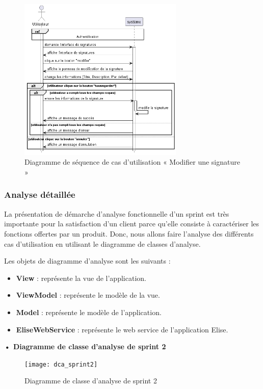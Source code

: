 \begin{figure}[H]
  \centering
  \includegraphics[width=0.7\textwidth]{out/diagrams/signatures/update/update_signature}
  \caption{Diagramme de séquence de cas d'utilisation « Modifier une signature  »}
  \label{fig:sequence_update_signature}
\end{figure}

\subsubsection{Analyse détaillée}
La présentation de démarche d'analyse fonctionnelle d'un sprint est très importante pour la satisfaction d'un client parce qu'elle consiste à caractériser les fonctions offertes par un produit.
Donc, nous allons faire l'analyse des différents cas d'utilisation en utilisant le diagramme de classes d'analyse.

Les objets de diagramme d'analyse sont les suivants :
\begin{itemize}
  \item \textbf{View} : représente la vue de l'application.
  \item \textbf{ViewModel} : représente le modèle de la vue.
  \item \textbf{Model} : représente le modèle de l'application.
  \item \textbf{EliseWebService} : représente le web service de l'application Elise.
\end{itemize}

\textbf{•	Diagramme de classe d'analyse de sprint 2 }
\newpage

\begin{figure}
  \centering
  \texttt{[image: dca\_sprint2]}
  \caption{Diagramme de classe d'analyse de sprint 2}
  \label{fig:class_analyse_signatures}
\end{figure}


